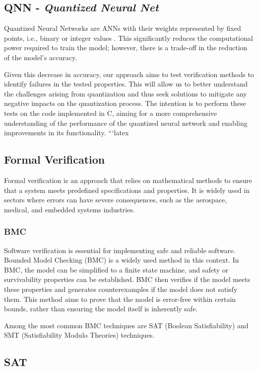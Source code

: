 \documentclass[conference]{IEEEtran}
\begin{document}
\subsection{QNN - \textit{Quantized Neural Net}}
Quantized Neural Networks are ANNs with their weights represented by fixed points, i.e., binary or integer values \cite{bnn_overview}. This significantly reduces the computational power required to train the model; however, there is a trade-off in the reduction of the model's accuracy.

Given this decrease in accuracy, our approach aims to test verification methods to identify failures in the tested properties. This will allow us to better understand the challenges arising from quantization and thus seek solutions to mitigate any negative impacts on the quantization process. The intention is to perform these tests on the code implemented in C, aiming for a more comprehensive understanding of the performance of the quantized neural network and enabling improvements in its functionality.
```latex
\subsection{Formal Verification}

Formal verification is an approach that relies on mathematical methods to ensure that a system meets predefined specifications and properties. It is widely used in sectors where errors can have severe consequences, such as the aerospace, medical, and embedded systems industries.

\subsubsection{BMC}

Software verification is essential for implementing safe and reliable software. Bounded Model Checking (BMC) is a widely used method in this context. In BMC, the model can be simplified to a finite state machine, and safety or survivability properties can be established. BMC then verifies if the model meets these properties and generates counterexamples if the model does not satisfy them. This method aims to prove that the model is error-free within certain bounds, rather than ensuring the model itself is inherently safe.

Among the most common BMC techniques are SAT (Boolean Satisfiability) and SMT (Satisfiability Modulo Theories) techniques.

\subsection{SAT}
\end{document}
